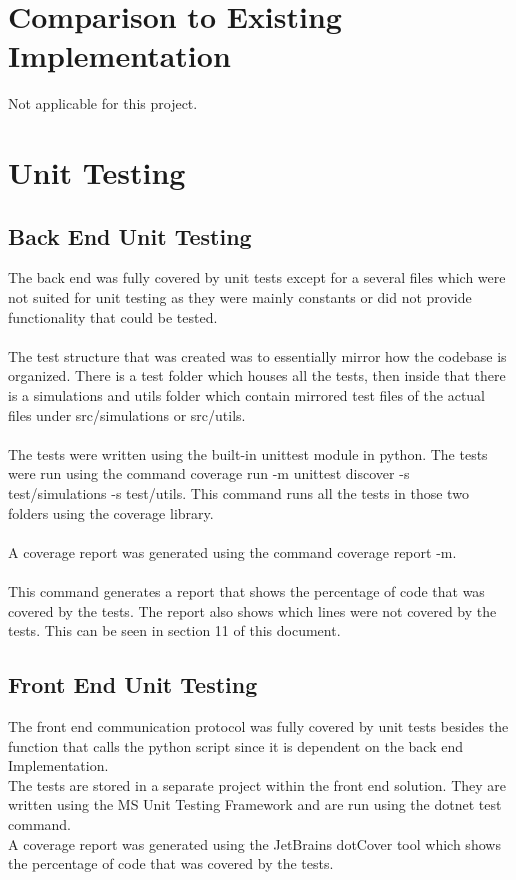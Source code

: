 \documentclass[12pt, titlepage]{article}
\begin{document}
\section{Comparison to Existing Implementation}	

Not applicable for this project.
\section{Unit Testing}

\subsection{Back End Unit Testing}
The back end was fully covered by unit tests except for a several files which were not suited for unit testing as they were mainly constants or did not provide functionality that could be tested. \\
\\
The test structure that was created was to essentially mirror how the codebase is organized. There is a test folder which houses all the tests, then inside that there is a simulations and utils folder which contain mirrored test files of the actual files under src/simulations or src/utils.\\
\\
The tests were written using the built-in unittest module in python. The tests were run using the command coverage run -m unittest discover -s test/simulations -s test/utils. This command runs all the tests in those two folders using the coverage library.\\
\\
A coverage report was generated using the command coverage report -m.\\
\\
This command generates a report that shows the percentage of code that was covered by the tests. The report also shows which lines were not covered by the tests.
This can be seen in section 11 of this document.\\

\subsection{Front End Unit Testing}
The front end communication protocol was fully covered by unit tests besides the function that calls the python script since it is dependent on the back end Implementation.
\\
The tests are stored in a separate project within the front end solution. They are written using the MS Unit Testing Framework and are run using the dotnet test command.
\\
A coverage report was generated using the JetBrains dotCover tool which shows the percentage of code that was covered by the tests.  
\end{document}
